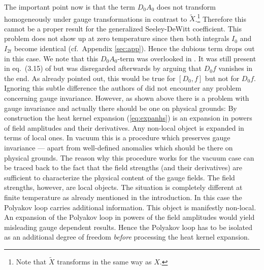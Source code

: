 \documentclass[a4paper,showpacs,showkeys,prd,nofootinbib]{revtex4}
\begin{document}
The important point now is that the term $D_0 A_0 $ does not transform homogeneously
under gauge transformations in contrast to $\tilde X$.\footnote{Note that $\tilde X$ 
transforms in the same way as $X$.} Therefore
this cannot be a proper result for the generalized Seeley-DeWitt coefficient. This
problem does not show up at zero temperature since then both integrals $I_0$ and
$I_{2t}$ become identical (cf.~Appendix \ref{sec:app}). 
Hence the dubious term drops out in this case. We note
that this $D_0 A_0$-term was overlooked in \cite{Boschi-Filho:1992ah}. It was still present in
eq.~(3.15) of \cite{Boschi-Filho:1992ah} but was disregarded afterwards by arguing that $D_0 f$
vanishes in the end. As already pointed out, this would be true for $[D_0,f]$ but
not for $D_0 f$. Ignoring this subtle difference the authors of \cite{Boschi-Filho:1992ah} did
not encounter any problem concerning gauge invariance. However, as shown above there is 
a problem with gauge invariance and actually there should be one on physical grounds:
By construction the heat kernel expansion (\ref{eq:expanhs}) is an expansion
in powers of field amplitudes and their derivatives. Any non-local object is 
expanded in terms of local ones. In vacuum this is a procedure which preserves gauge 
invariance --- apart from well-defined anomalies which should be there on physical
grounds. The reason why this procedure works for the vacuum case can be traced back
to the fact that the field strengths (and their derivatives) are sufficient to 
characterize the physical content of the gauge fields. The field strengths, however,
are local objects. The situation is completely different at finite temperature
as already mentioned in the introduction. In this case the Polyakov loop carries
additional information. This object is manifestly non-local. An expansion of the
Polyakov loop in powers of the field amplitudes would yield misleading gauge dependent
results. Hence the Polyakov loop has to be isolated as an additional degree of freedom
{\em before} processing the heat kernel expansion.
\end{document}
